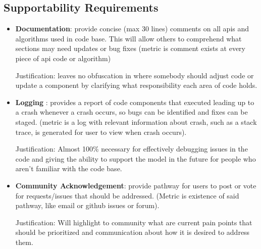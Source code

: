 \documentclass[12pt]{article}
\begin{document}
\subsection{Supportability Requirements}
\begin{itemize}
    \item \textbf{Documentation}: provide concise (max 30 lines) comments on 
    all apis and algorithms used in code base. This will allow others to 
    comprehend what sections may need updates or bug fixes (metric is 
    comment exists at every piece of api code or algorithm)
    
    Justification: leaves no obfuscation in where somebody should adjust 
    code or update a component by clarifying what responsibility each area
     of code holds.

    \item \textbf{Logging }: provides a report of code components that 
    executed leading up to a crash whenever a crash occurs, so bugs can 
    be identified and fixes can be staged. (metric is a log with relevant 
    information about crash, such as a stack trace, is generated for user 
    to view when crash occurs).

    Justification: Almost 100\% necessary for effectively debugging issues in
     the code and giving the ability to support the model in the future for 
     people who aren't familiar with the code base.

    \item \textbf{Community Acknowledgement}: provide pathway for users to post
     or vote for requests/issues that should be addressed. (Metric is existence
      of said pathway, like email or github issues or forum).

    Justification: Will highlight to community what are current pain points 
    that should be prioritized and communication about how it is desired to 
    address them.

\end{itemize}
\end{document}
